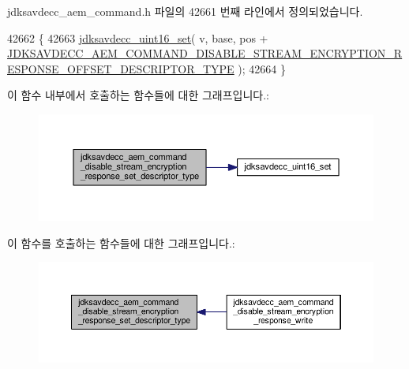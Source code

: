 jdksavdecc\+\_\+aem\+\_\+command.\+h 파일의 42661 번째 라인에서 정의되었습니다.


\begin{DoxyCode}
42662 \{
42663     \hyperlink{group__endian_ga14b9eeadc05f94334096c127c955a60b}{jdksavdecc\_uint16\_set}( v, base, pos + 
      \hyperlink{group__command__disable__stream__encryption__response_ga27c81c1fb1cb51ecb1d0b5dd451d2ffd}{JDKSAVDECC\_AEM\_COMMAND\_DISABLE\_STREAM\_ENCRYPTION\_RESPONSE\_OFFSET\_DESCRIPTOR\_TYPE}
       );
42664 \}
\end{DoxyCode}


이 함수 내부에서 호출하는 함수들에 대한 그래프입니다.\+:
\nopagebreak
\begin{figure}[H]
\begin{center}
\leavevmode
\includegraphics[width=350pt]{group__command__disable__stream__encryption__response_ga7affde1d3606b5444b9e26b7ae973601_cgraph}
\end{center}
\end{figure}




이 함수를 호출하는 함수들에 대한 그래프입니다.\+:
\nopagebreak
\begin{figure}[H]
\begin{center}
\leavevmode
\includegraphics[width=350pt]{group__command__disable__stream__encryption__response_ga7affde1d3606b5444b9e26b7ae973601_icgraph}
\end{center}
\end{figure}


